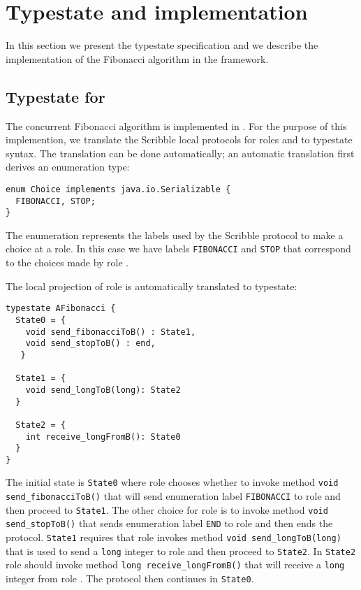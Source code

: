\section{Typestate and \Mungo implementation}
In this section we present the typestate specification
and we describe the implementation of the Fibonacci
algorithm in the \Mungo framework.

\subsection{Typestate for \Mungo}
\label{sec:typestate}
The concurrent Fibonacci algorithm is implemented in \Mungo.
For the purpose of this implemention,
we translate the Scribble local protocols for roles
\A and \B to \Mungo typestate syntax.
The translation can be done automatically;
an automatic translation first derives an
enumeration type:

\begin{lstlisting}[caption={Enumeration for the communication choice}]
enum Choice implements java.io.Serializable {
  FIBONACCI, STOP;
}
\end{lstlisting}

The enumeration represents the
labels used by the Scribble protocol
to make a choice at a role. In this
case we have labels \lstinline|FIBONACCI| and
\lstinline|STOP| that correspond to the choices
made by role \A.

The local projection of role \A is automatically translated to typestate:

\begin{lstlisting}[caption={Typestate for Role \A}]
typestate AFibonacci {
  State0 = {
    void send_fibonacciToB() : State1,
    void send_stopToB() : end,
   }

  State1 = {
    void send_longToB(long): State2
  }

  State2 = {
    int receive_longFromB(): State0
  }
}
\end{lstlisting}

The initial state is \lstinline|State0| where
role \A chooses whether to invoke method
\lstinline|void send_fibonacciToB()| that
will send enumeration label \lstinline|FIBONACCI| to role \B
and then proceed to \lstinline|State1|. The other
choice for role \A is to invoke method
\lstinline|void send_stopToB()| that sends
enumeration label \lstinline|END| to role \B
and then ends the protocol.
\lstinline|State1| requires that role \A invokes
method \lstinline|void send_longToB(long)| that
is used to send a \lstinline|long| integer to role
\B and then proceed to \lstinline|State2|. In 
\lstinline|State2| role \A should invoke method
\lstinline|long receive_longFromB()| that will
receive a \lstinline|long| integer from role \B.
The protocol then continues in \lstinline|State0|.


